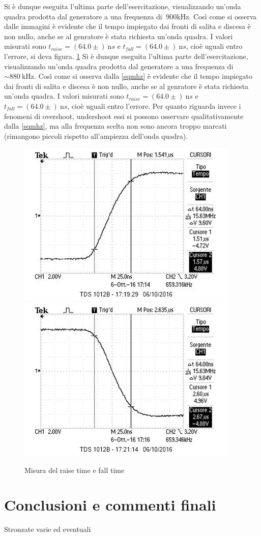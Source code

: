 \documentclass[10pt,a4paper]{article}
\begin{document}
Si è dunque eseguita l'ultima parte dell'esercitazione, visualizzando un'onda quadra prodotta dal generatore a una frequenza di $~900 \text{kHz}$.
Così come si osserva dalle immagini è evidente che il tempo impiegato dai fronti di salita e discesa è non nullo, anche se al genratore è stata richiesta un'onda quadra. I valori misurati sono $t_{raise} = (64.0 \pm )~\text{n}s$ e $t_{fall} = (64.0 \pm )~\text{n}s$, cioè uguali entro l'errore, si deva figura. \figurename{\ref{f:raise}}
Si è dunque eseguita l'ultima parte dell'esercitazione, visualizzando un'onda quadra prodotta dal generatore a una frequenza di $\sim880~\text{kHz}$.
Così come si osserva dalla \figurename{\ref{sqmhz}} è evidente che il tempo impiegato dai fronti di salita e discesa è non nullo, anche se al genratore è stata richiesta un'onda quadra. I valori misurati sono $t_{raise} = (64.0 \pm )~\text{n}s$ e $t_{fall} = (64.0 \pm )~\text{n}s$, cioè uguali entro l'errore. %
Per quanto riguarda invece i fenomeni di overshoot, undershoot essi si possono osservare qualitativamente dalla \figurename{\ref{sqmhz}}, ma alla frequenza scelta non sono ancora troppo marcati (rimangono piccoli rispetto all'ampiezza dell'onda quadra).

\begin{figure}[h]
	\centering
	\includegraphics[scale=0.6]{../Oscilloscopio/raise_time.jpg}
	\includegraphics[scale=0.6]{../Oscilloscopio/fall_time.jpg}
	\caption{Misura del raise time e fall time}
	\label{f:raise}
\end{figure}

\section{Conclusioni e commenti finali}
Stronzate varie ed eventuali
\end{document}
